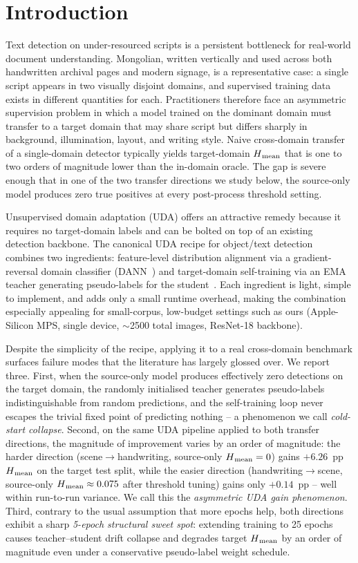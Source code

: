 \section{Introduction}
\label{sec:intro}

Text detection on under-resourced scripts is a persistent bottleneck for
real-world document understanding. Mongolian, written vertically and used
across both handwritten archival pages and modern signage, is a
representative case: a single script appears in two visually disjoint
domains, and supervised training data exists in different quantities for
each. Practitioners therefore face an asymmetric supervision problem in
which a model trained on the dominant domain must transfer to a target
domain that may share script but differs sharply in background,
illumination, layout, and writing style. Naive cross-domain transfer
of a single-domain detector typically yields target-domain
$H\textsubscript{mean}$ that is one to two orders of magnitude lower than the
in-domain oracle. The gap is severe enough that in one of the two
transfer directions we study below, the source-only model produces
zero true positives at every post-process threshold setting.

Unsupervised domain adaptation (UDA) offers an attractive remedy
because it requires no target-domain labels and can be bolted on top of
an existing detection backbone. The canonical UDA recipe for
object/text detection combines two ingredients: feature-level
distribution alignment via a gradient-reversal domain classifier
(DANN~\cite{ganin2015dann}) and target-domain self-training via an
EMA teacher generating pseudo-labels for the student~\cite{li2022adapttch}.
Each ingredient is light, simple to implement, and adds only a small
runtime overhead, making the combination especially appealing for
small-corpus, low-budget settings such as ours (Apple-Silicon MPS,
single device, $\sim$2500 total images, ResNet-18 backbone).

Despite the simplicity of the recipe, applying it to a real cross-domain
benchmark surfaces failure modes that the literature has largely
glossed over. We report three. First, when the source-only model
produces effectively zero detections on the target domain, the
randomly initialised teacher generates pseudo-labels indistinguishable
from random predictions, and the self-training loop never escapes the
trivial fixed point of predicting nothing -- a phenomenon we call
\emph{cold-start collapse}. Second, on the same UDA pipeline applied
to both transfer directions, the magnitude of improvement varies by an
order of magnitude: the harder direction (scene$\to$handwriting,
source-only $H\textsubscript{mean} = 0$) gains $+6.26$~pp $H\textsubscript{mean}$ on the target test
split, while the easier direction
(handwriting$\to$scene, source-only $H\textsubscript{mean} \approx 0.075$ after
threshold tuning) gains only $+0.14$~pp -- well within run-to-run
variance. We call this the \emph{asymmetric UDA gain phenomenon}.
Third, contrary to the usual assumption that more epochs help, both
directions exhibit a sharp \emph{5-epoch structural sweet spot}:
extending training to 25 epochs causes teacher--student drift
collapse and degrades target $H\textsubscript{mean}$ by an order of magnitude even
under a conservative pseudo-label weight schedule.

